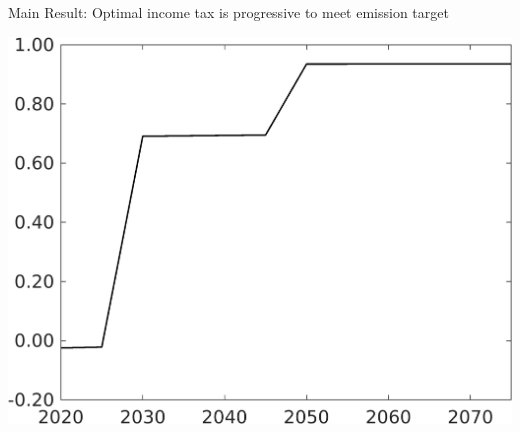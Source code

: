 \documentclass[11pt,aspectratio=169]{beamer}
\begin{document}
\begin{frame}{Main Result: Optimal income tax is progressive to meet emission target}
\begin{minipage}[]{0.32\textwidth}
	\includegraphics[width=1\textwidth]{../codding_model/own_basedOnFried/optimalPol_elastS_DisuSci/figures/all_1705/Single_OPT_T_NoTaus_tauf_spillover0_sep1_BN0_ineq0_red0_etaa0.79.png}
	\end{minipage}


\end{frame}
\end{document}
